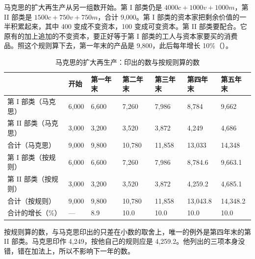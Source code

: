 马克思的扩大再生产从另一组数开始。第 I 部类仍是 $4000c+1000v+1000m$，第 II 部类是 $1500c+750v+750m$，合计 9,000\cite{marx1909k2}。第 I 部类的资本家把剩余价值的一半积累起来，其中 400 变成不变资本，100 变成可变资本\cite{marx1909k2}。第 II 部类要配合。它原有的加上追加的不变资本，要正好等于第 I 部类的工人与资本家要买的消费品。照这个规则算下去，第一年末的产品是 9,800，此后每年增长 10\%（）。

\begin{table}[!tb]\centering\small
\caption{马克思的扩大再生产：印出的数与按规则算的数}\label{tab:marx-path}
\begin{tabularx}{\linewidth}{@{}lYYYYYY@{}}
\toprule
 & 开始 & 第一年末 & 第二年末 & 第三年末 & 第四年末 & 第五年末\\\midrule
第 I 部类（马克思） & 6,000 & 6,600 & 7,260 & 7,986 & 8,784 & 9,662\\
第 II 部类（马克思） & 3,000 & 3,200 & 3,520 & 3,872 & 4,249 & 4,686\\
合计（马克思） & 9,000 & 9,800 & 10,780 & 11,858 & 13,033 & 14,348\\\midrule
第 I 部类（按规则） & 6,000 & 6,600 & 7,260 & 7,986 & 8,784.6 & 9,663.1\\
第 II 部类（按规则） & 3,000 & 3,200 & 3,520 & 3,872 & 4,259.2 & 4,685.1\\
合计（按规则） & 9,000 & 9,800 & 10,780 & 11,858 & 13,043.8 & 14,348.2\\
合计的增长（\%） & — & 8.9 & 10.0 & 10.0 & 10.0 & 10.0\\
\bottomrule
\end{tabularx}
\end{table}

按规则算的数，与马克思印出的只差在小数的取舍上，唯一的例外是第四年末的第 II 部类。马克思印作 4,249，按他自己的规则应是 4,259.2。他列出的三项本身没错，错在加法上，所以不影响下一年的数。

